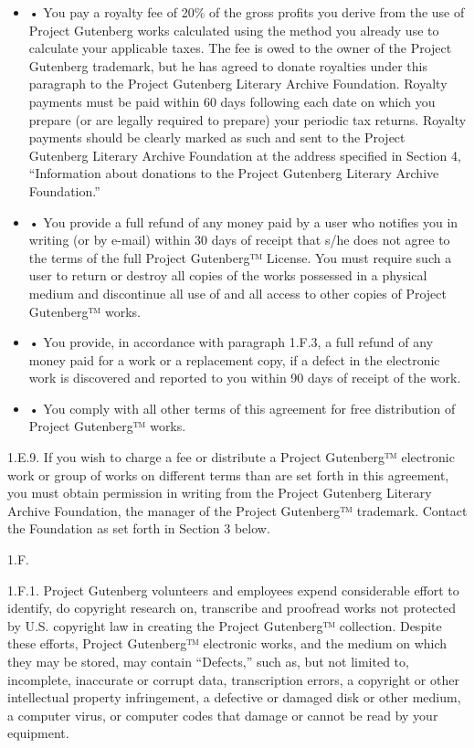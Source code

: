 \documentclass[11pt,openany,oneside]{book}
\begin{document}
\begin{itemize}
\item{} • You pay a royalty fee of 20\% of the gross profits you derive from the use of Project Gutenberg works calculated using the method you already use to calculate your applicable taxes. The fee is owed to the owner of the Project Gutenberg trademark, but he has agreed to donate royalties under this paragraph to the Project Gutenberg Literary Archive Foundation. Royalty payments must be paid within 60 days following each date on which you prepare (or are legally required to prepare) your periodic tax returns. Royalty payments should be clearly marked as such and sent to the Project Gutenberg Literary Archive Foundation at the address specified in Section 4, “Information about donations to the Project Gutenberg Literary Archive Foundation.” 

\item{} • You provide a full refund of any money paid by a user who notifies you in writing (or by e-mail) within 30 days of receipt that s/he does not agree to the terms of the full Project Gutenberg™ License. You must require such a user to return or destroy all copies of the works possessed in a physical medium and discontinue all use of and all access to other copies of Project Gutenberg™ works. 

\item{} • You provide, in accordance with paragraph 1.F.3, a full refund of any money paid for a work or a replacement copy, if a defect in the electronic work is discovered and reported to you within 90 days of receipt of the work. 

\item{} • You comply with all other terms of this agreement for free distribution of Project Gutenberg™ works. 

\end{itemize}
1.E.9. If you wish to charge a fee or distribute a Project Gutenberg™ electronic work or group of works on different terms than are set forth in this agreement, you must obtain permission in writing from the Project Gutenberg Literary Archive Foundation, the manager of the Project Gutenberg™ trademark. Contact the Foundation as set forth in Section 3 below. 

1.F. 

1.F.1. Project Gutenberg volunteers and employees expend considerable effort to identify, do copyright research on, transcribe and proofread works not protected by U.S. copyright law in creating the Project Gutenberg™ collection. Despite these efforts, Project Gutenberg™ electronic works, and the medium on which they may be stored, may contain “Defects,” such as, but not limited to, incomplete, inaccurate or corrupt data, transcription errors, a copyright or other intellectual property infringement, a defective or damaged disk or other medium, a computer virus, or computer codes that damage or cannot be read by your equipment. 
\end{document}
